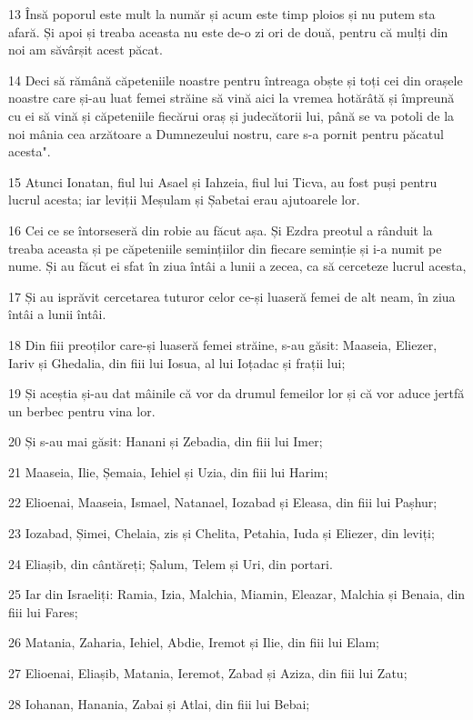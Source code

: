 \par 13 Însă poporul este mult la număr și acum este timp ploios și nu putem sta afară. Și apoi și treaba aceasta nu este de-o zi ori de două, pentru că mulți din noi am săvârșit acest păcat.
\par 14 Deci să rămână căpeteniile noastre pentru întreaga obște și toți cei din orașele noastre care și-au luat femei străine să vină aici la vremea hotărâtă și împreună cu ei să vină și căpeteniile fiecărui oraș și judecătorii lui, până se va potoli de la noi mânia cea arzătoare a Dumnezeului nostru, care s-a pornit pentru păcatul acesta".
\par 15 Atunci Ionatan, fiul lui Asael și Iahzeia, fiul lui Ticva, au fost puși pentru lucrul acesta; iar leviții Meșulam și Șabetai erau ajutoarele lor.
\par 16 Cei ce se întorseseră din robie au făcut așa. Și Ezdra preotul a rânduit la treaba aceasta și pe căpeteniile semințiilor din fiecare seminție și i-a numit pe nume. Și au făcut ei sfat în ziua întâi a lunii a zecea, ca să cerceteze lucrul acesta,
\par 17 Și au isprăvit cercetarea tuturor celor ce-și luaseră femei de alt neam, în ziua întâi a lunii întâi.
\par 18 Din fiii preoților care-și luaseră femei străine, s-au găsit: Maaseia, Eliezer, Iariv și Ghedalia, din fiii lui Iosua, al lui Ioțadac și frații lui;
\par 19 Și aceștia și-au dat mâinile că vor da drumul femeilor lor și că vor aduce jertfă un berbec pentru vina lor.
\par 20 Și s-au mai găsit: Hanani și Zebadia, din fiii lui Imer;
\par 21 Maaseia, Ilie, Șemaia, Iehiel și Uzia, din fiii lui Harim;
\par 22 Elioenai, Maaseia, Ismael, Natanael, Iozabad și Eleasa, din fiii lui Pașhur;
\par 23 Iozabad, Șimei, Chelaia, zis și Chelita, Petahia, Iuda și Eliezer, din leviți;
\par 24 Eliașib, din cântăreți; Șalum, Telem și Uri, din portari.
\par 25 Iar din Israeliți: Ramia, Izia, Malchia, Miamin, Eleazar, Malchia și Benaia, din fiii lui Fares;
\par 26 Matania, Zaharia, Iehiel, Abdie, Iremot și Ilie, din fiii lui Elam;
\par 27 Elioenai, Eliașib, Matania, Ieremot, Zabad și Aziza, din fiii lui Zatu;
\par 28 Iohanan, Hanania, Zabai și Atlai, din fiii lui Bebai;
